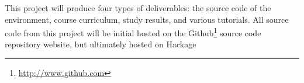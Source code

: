 This project will produce four types of deliverables: the source code
of the \thelang{} environment, course curriculum, study results, and
various tutorials.  All source code from this project will be initial
hosted on the Github\footnote{\url{http://www.github.com}} source code
repository website, but ultimately hosted on Hackage
